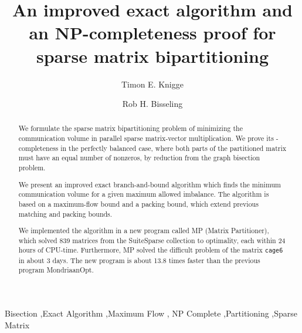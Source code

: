 \documentclass[5p,times]{elsarticle}
\begin{document}
	\title{An improved exact algorithm and an NP-completeness proof for sparse matrix bipartitioning}

	\author[timon]{Timon E. Knigge}
	\address[timon]{ETH Z\"urich\\
				Z\"urich, Switzerland}

	\author[rob]{Rob H. Bisseling}
	\address[rob]{Mathematical Institute,
				Utrecht University\\
				Utrecht, The Netherlands}


	\begin{abstract}
		We formulate the sparse matrix bipartitioning problem of
		minimizing the communication volume in parallel sparse
		matrix-vector multiplication. We prove its \NP-completeness
		in the perfectly balanced case, where both parts of the
		partitioned matrix must have an equal number of nonzeros,
		by reduction from the graph bisection problem.

		We present an improved exact branch-and-bound algorithm
		which finds the minimum communication volume for a given
		maximum allowed imbalance. The algorithm is based on a
		maximum-flow bound and a packing bound, which extend
		previous matching and packing bounds.

		We implemented the algorithm in a new program called MP
		(Matrix Partitioner), which solved 839 matrices from the
		SuiteSparse collection to optimality, each within 24 hours
		of CPU-time. Furthermore, MP solved the difficult problem
		of the matrix \texttt{cage6} in about 3 days. The new
		program is about 13.8 times faster than the previous program
		MondriaanOpt.
	\end{abstract}
	\begin{keyword}
		Bisection \sep Exact Algorithm \sep Maximum Flow \sep
		NP Complete \sep Partitioning \sep Sparse Matrix
	\end{keyword}

	\maketitle


	
	
	
	
	
	

	
	
\end{document}
